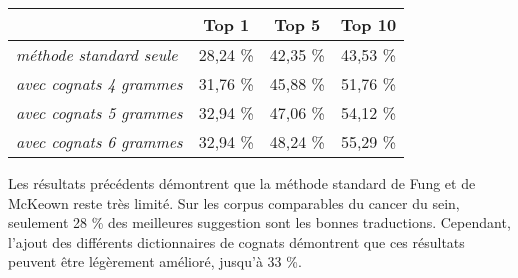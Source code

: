 	\begin{center}
		\begin{tabular}{|l | c c c |}
			\hline
			 & \textbf{Top 1} & \textbf{Top 5} & \textbf{Top 10}\rule[-6pt]{0pt}{18pt} \\
			\hline
			\textit{méthode standard seule} & 28,24 \% & 42,35 \% & 43,53 \% \rule[-4pt]{0pt}{14pt}\\
			\hline
			\textit{avec cognats 4 grammes} & 31,76 \% & 45,88 \% & 51,76 \% \rule[-4pt]{0pt}{14pt}\\
			\hline
			\textit{avec cognats 5 grammes} & 32,94 \% & 47,06 \% & 54,12 \% \rule[-4pt]{0pt}{14pt}\\
			\hline
			\textit{avec cognats 6 grammes} & 32,94 \% & 48,24 \% & 55,29 \% \rule[-4pt]{0pt}{14pt}\\
			\hline
		\end{tabular}
	\end{center}
	

	Les résultats précédents démontrent que la méthode standard de Fung et de McKeown reste très limité. Sur les corpus comparables du cancer du sein, seulement 28 \% des meilleures suggestion sont les bonnes traductions. Cependant, l'ajout des différents dictionnaires de cognats démontrent que ces résultats peuvent être légèrement amélioré, jusqu'à 33 \%.
